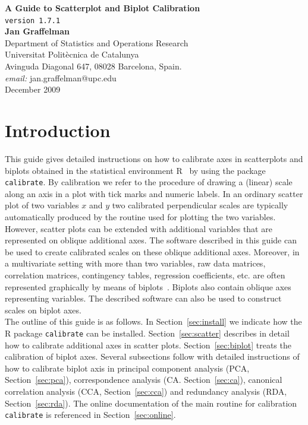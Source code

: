 \documentclass[a4paper]{article}
\begin{document}
\begin{center}
\sf
{\sf \bf \Large A Guide to Scatterplot and Biplot Calibration}\\
\vspace{4mm}
{\sf \normalsize {\tt version 1.7.1}}\\%
\vspace{4mm}
{\bf \large Jan Graffelman}\\
\vspace{4mm} \rm \large
Department of Statistics and Operations Research\\
Universitat Polit\`ecnica de Catalunya\\
Avinguda Diagonal 647, 08028 Barcelona, Spain.\\
{\it email:} jan.graffelman@upc.edu\\
\vspace{4mm}
{\sc December 2009}
\end{center}

\section{Introduction}

This guide gives detailed instructions on how to calibrate axes in scatterplots
and biplots obtained in the statistical environment R~\cite{RRR} by using the package
{\tt calibrate}. By calibration we 
refer to the procedure of drawing a (linear) scale along an axis in a plot with 
tick marks and numeric labels. In an ordinary scatter plot of two variables $x$ and $y$ 
two calibrated perpendicular scales are typically automatically produced by the 
routine used for plotting the two variables. However, scatter plots can be
extended with additional variables that are represented on oblique additional
axes. The software described in this guide can be used to create calibrated
scales on these oblique additional axes. Moreover, in a multivariate setting with more
than two variables, raw data matrices, correlation matrices, contingency tables,
regression coefficients, etc. are often represented graphically by means of biplots~\cite{Gabriel}. Biplots
also contain oblique axes representing variables. The described software can also be
used to construct scales on biplot axes.\\

The outline of this guide is as follows. In Section~\ref{sec:install} we indicate how the 
R package {\tt calibrate} can be installed. Section~\ref{sec:scatter} describes in detail
how to calibrate additional axes in scatter plots. Section~\ref{sec:biplot} treats the 
calibration of biplot axes. Several subsections follow with detailed
instructions of how to calibrate biplot axis in principal component analysis
(PCA, Section~\ref{sec:pca}), correspondence analysis (CA. Section~\ref{sec:ca}), 
canonical correlation analysis (CCA, Section~\ref{sec:cca}) and redundancy analysis (RDA, Section~\ref{sec:rda}). 
The online documentation of the main routine for calibration {\tt calibrate} is referenced in 
Section~\ref{sec:online}.\\
\end{document}

